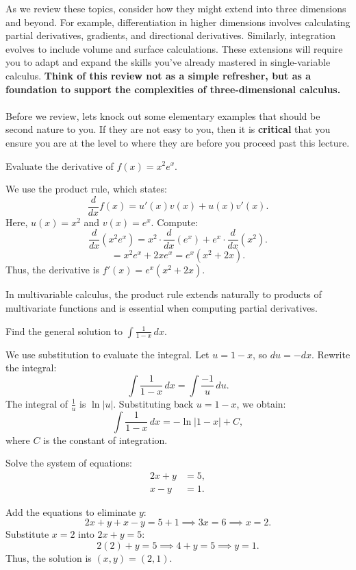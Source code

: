 \noindent As we review these topics, consider how they might extend into three dimensions and beyond. For example, differentiation in higher dimensions involves calculating partial derivatives, gradients, and directional derivatives. Similarly, integration evolves to include volume and surface calculations. These extensions will require you to adapt and expand the skills you’ve already mastered in single-variable calculus. \textbf{Think of this review not as a simple refresher, but as a foundation to support the complexities of three-dimensional calculus.} \\ \\ Before we review, lets knock out some elementary examples that should be second nature to you. If they are not easy to you, then it is \textbf{critical} that you ensure you are at the level to where they are before you proceed past this lecture.


\exampleline
\begin{example}
Evaluate the derivative of \( f(x) = x^2 e^x \).

\begin{solution}
We use the product rule, which states:
\[
\frac{d}{dx} f(x) = u'(x)v(x) + u(x)v'(x).
\]
Here, \( u(x) = x^2 \) and \( v(x) = e^x \). Compute:
\[
\frac{d}{dx}(x^2 e^x) = x^2 \cdot \frac{d}{dx}(e^x) + e^x \cdot \frac{d}{dx}(x^2).
\]
\[
= x^2 e^x + 2x e^x = e^x(x^2 + 2x).
\]
Thus, the derivative is \( f'(x) = e^x(x^2 + 2x) \).
\end{solution}
\end{example}
\exampleline

\noindent In multivariable calculus, the product rule extends naturally to products of multivariate functions and is essential when computing partial derivatives.

\begin{example}
Find the general solution to \( \int \frac{1}{1 - x} \, dx \).

\begin{solution}
We use substitution to evaluate the integral. Let \( u = 1 - x \), so \( du = -dx \). Rewrite the integral:
\[
\int \frac{1}{1 - x} \, dx = \int \frac{-1}{u} \, du.
\]
The integral of \( \frac{1}{u} \) is \( \ln|u| \). Substituting back \( u = 1 - x \), we obtain:
\[
\int \frac{1}{1 - x} \, dx = -\ln|1 - x| + C,
\]
where \( C \) is the constant of integration.
\end{solution}
\end{example}
\exampleline


\begin{example}
Solve the system of equations:
\[
\begin{aligned}
2x + y &= 5, \\
x - y &= 1.
\end{aligned}
\]

\begin{solution}
Add the equations to eliminate \( y \):
\[
2x + y + x - y = 5 + 1 \implies 3x = 6 \implies x = 2.
\]
Substitute \( x = 2 \) into \( 2x + y = 5 \):
\[
2(2) + y = 5 \implies 4 + y = 5 \implies y = 1.
\]
Thus, the solution is \( (x, y) = (2, 1) \).
\end{solution}
\end{example}
\exampleline

